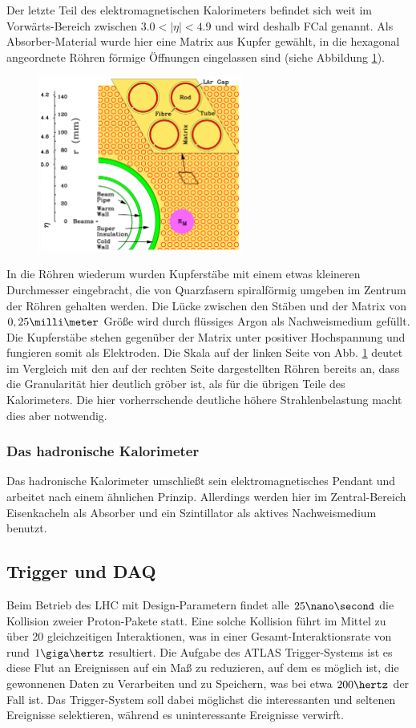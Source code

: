 Der letzte Teil des elektromagnetischen Kalorimeters befindet sich weit im
Vorwärts-Bereich zwischen $3.0<|\eta|<4.9$ und wird deshalb \acf{FCal} genannt.
Als Absorber-Material wurde hier eine Matrix aus Kupfer gewählt, in die
hexagonal angeordnete Röhren förmige Öffnungen eingelassen sind (siehe
Abbildung \ref{fig:fcal}).
\begin{figure}[h]
    \centering
    \includegraphics[width=0.6\textwidth]{img/fcal}
    \caption[]{}
    \label{fig:fcal}
\end{figure}
In die Röhren wiederum wurden Kupferstäbe mit einem etwas kleineren Durchmesser
eingebracht, die von Quarzfasern spiralförmig umgeben im Zentrum der Röhren
gehalten werden. Die Lücke zwischen den Stäben und der Matrix von
$0,25\milli\meter$ Größe wird durch flüssiges Argon als Nachweismedium
gefüllt. Die Kupferstäbe stehen gegenüber der Matrix unter positiver
Hochspannung und fungieren somit als Elektroden. Die Skala auf der linken Seite
von Abb. \ref{fig:fcal} deutet im Vergleich mit den auf der rechten Seite
dargestellten Röhren bereits an, dass die Granularität hier deutlich gröber
ist, als für die übrigen Teile des Kalorimeters. Die hier vorherrschende
deutliche höhere Strahlenbelastung macht dies aber notwendig.

\subsubsection{Das hadronische Kalorimeter}
Das hadronische Kalorimeter umschließt sein elektromagnetisches Pendant und
arbeitet nach einem ähnlichen Prinzip. Allerdings werden hier im
Zentral-Bereich Eisenkacheln als Absorber und ein Szintillator als aktives
Nachweismedium benutzt.



\subsection{Trigger und DAQ}
\label{trigger_daq}
Beim Betrieb des \ac{LHC} mit Design-Parametern findet alle $25\nano\second$
die Kollision zweier Proton-Pakete statt. Eine solche Kollision führt im Mittel
zu über 20 gleichzeitigen Interaktionen, was in einer Gesamt-Interaktionsrate
von rund $1\giga\hertz$ resultiert. Die Aufgabe des ATLAS Trigger-Systems ist
es diese Flut an Ereignissen auf ein Maß zu reduzieren, auf dem es möglich ist,
die gewonnenen Daten zu Verarbeiten und zu Speichern, was bei etwa $200\hertz$
der Fall ist. Das Trigger-System soll dabei möglichst die interessanten und
seltenen Ereignisse selektieren, während es uninteressante Ereignisse verwirft.

